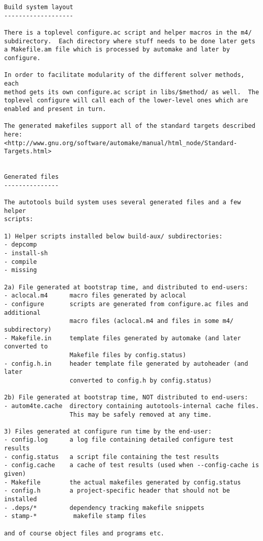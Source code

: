 \begin{verbatim}
Build system layout
-------------------

There is a toplevel configure.ac script and helper macros in the m4/
subdirectory.  Each directory where stuff needs to be done later gets
a Makefile.am file which is processed by automake and later by configure.

In order to facilitate modularity of the different solver methods, each
method gets its own configure.ac script in libs/$method/ as well.  The
toplevel configure will call each of the lower-level ones which are
enabled and present in turn.

The generated makefiles support all of the standard targets described here:
<http://www.gnu.org/software/automake/manual/html_node/Standard-Targets.html>


Generated files
---------------

The autotools build system uses several generated files and a few helper
scripts:

1) Helper scripts installed below build-aux/ subdirectories:
- depcomp
- install-sh
- compile
- missing

2a) File generated at bootstrap time, and distributed to end-users:
- aclocal.m4      macro files generated by aclocal
- configure       scripts are generated from configure.ac files and additional
                  macro files (aclocal.m4 and files in some m4/ subdirectory)
- Makefile.in     template files generated by automake (and later converted to
                  Makefile files by config.status)
- config.h.in     header template file generated by autoheader (and later
                  converted to config.h by config.status)

2b) File generated at bootstrap time, NOT distributed to end-users:
- autom4te.cache  directory containing autotools-internal cache files.
                  This may be safely removed at any time.

3) Files generated at configure run time by the end-user:
- config.log      a log file containing detailed configure test results
- config.status   a script file containing the test results
- config.cache    a cache of test results (used when --config-cache is given)
- Makefile        the actual makefiles generated by config.status
- config.h        a project-specific header that should not be installed
- .deps/*         dependency tracking makefile snippets
- stamp-*          makefile stamp files

and of course object files and programs etc.


\end{verbatim}
